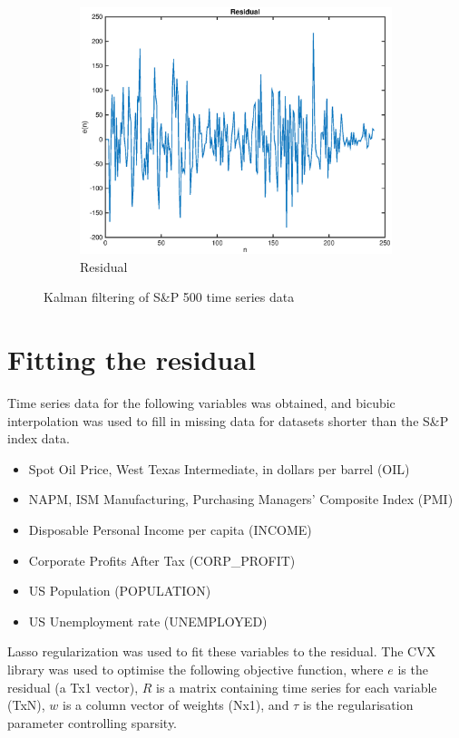 \documentclass[12pt]{article}
\begin{document}
\begin{figure}
\begin{subfigure}[b]{0.45\textwidth}
      \includegraphics[width=\textwidth]{figures/real_residual.eps}
      \caption{Residual}
      \label{fig:real_residual}
    \end{subfigure}
    \caption{Kalman filtering of S\&P 500 time series data}
  \end{figure}

  \section{Fitting the residual}

  Time series data for the following variables was obtained, and bicubic interpolation was used to fill in missing data for datasets shorter than the S\&P index data.

  \begin{itemize}
    \item Spot Oil Price, West Texas Intermediate, in dollars per barrel (OIL)
    \item NAPM, ISM Manufacturing, Purchasing Managers' Composite Index (PMI)
    \item Disposable Personal Income per capita (INCOME)
    \item Corporate Profits After Tax (CORP\_PROFIT)
    \item US Population (POPULATION)
    \item US Unemployment rate (UNEMPLOYED)
  \end{itemize}

  Lasso regularization \cite{Tibshirani1996} was used to fit these variables to the residual. The CVX library was used to optimise the following objective function, where $e$ is the residual (a Tx1 vector), $R$ is a matrix containing time series for each variable (TxN), $w$ is a column vector of weights (Nx1), and $\tau$ is the regularisation parameter controlling sparsity.
\end{document}
